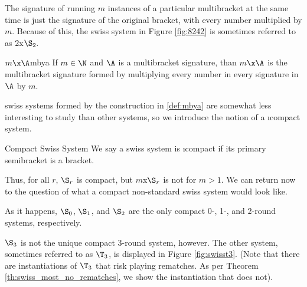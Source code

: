 {    

    The signature of running $m$ instances of a particular multibracket at the same time is just the signature of the original bracket, with every number multiplied by $m$. Because of this, the swiss system in Figure \ref{fig:8242} is sometimes referred to as 2x$\S_2.$

    \begin{definition}{$m\x\A$}{mbya}
        If $m \in \N$ and $\A$ is a multibracket signature, than $m\x\A$ is the multibracket signature formed by multiplying every number in every signature in $\A$ by $m$.
    \end{definition}

    swiss systems formed by the construction in \ref{def:mbya} are somewhat less interesting to study than other systems, so we introduce the notion of a \i{compact} system.

    \begin{definition}{Compact Swiss System}{}
        We say a swiss system is \i{compact} if its primary semibracket is a bracket.
    \end{definition}

    Thus, for all $r$, $\S_r$ is compact, but $m$x$\S_r$ is not for $m > 1.$ We can return now to the question of what a compact non-standard swiss system would look like.

    As it happens, $\S_0$, $\S_1$, and $\S_2$ are the only compact 0-, 1-, and 2-round systems, respectively.


    $\S_3$ is not the unique compact $3$-round system, however. The other system, sometimes referred to as $\T_3$, is displayed in Figure \ref{fig:swisst3}. (Note that there are instantiations of $\T_3$ that risk playing rematches. As per Theorem \ref{th:swiss_most_no_rematches}, we show the instantiation that does not).

}

